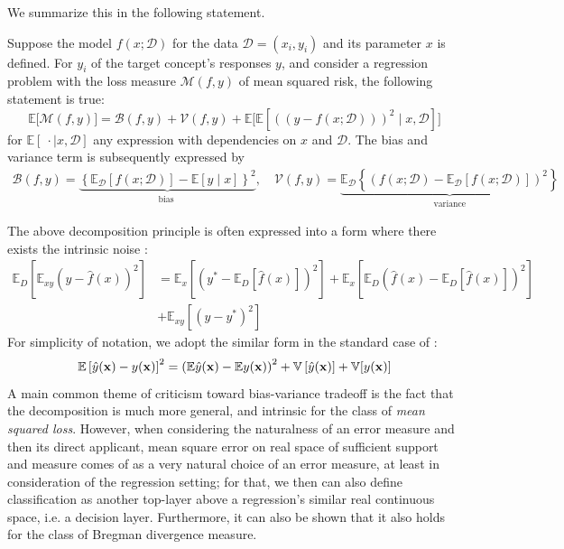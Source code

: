 \documentclass[10pt]{article}
\begin{document}
We summarize this in the following statement. 

\begin{theorem}
    Suppose the model $f(x;\mathcal{D})$ for the data $\mathcal{D}=(x_i, y_i)$ and its parameter $x$ is defined. For $y_{i}$ of the target concept's responses $y$, and consider a regression problem with the loss measure $\mathcal{M}(f,y)$ of mean squared risk, the following statement is true: \begin{equation}
        \mathbb{E}\big[\mathcal{M}(f,y)\big] = \mathcal{B}(f,y) + \mathcal{V}(f,y) + \mathbb{E}\Big[\mathbb{E} \left[((y-f(x;\mathcal{D})))^{2}\mid x, \mathcal{D}\right]\Big]
    \end{equation}
    for $\mathbb{E}[\:\cdot\mid x, \mathcal{D}]$ any expression with dependencies on $x$ and $\mathcal{D}$. The bias and variance term is subsequently expressed by 
    \begin{align}
        \mathcal{B}(f,y) = \underbrace{\left\{ \mathbb{E}_{\mathcal{D}}[f(x;\mathcal{D})] - \mathbb{E}[y\mid x] \right\}^{2}}_{\text{bias }}, \quad \mathcal{V}(f,y) =\underbrace{\mathbb{E}_{\mathcal{D}} \left\{(f(x;\mathcal{D})- \mathbb{E}_{\mathcal{D}}[f(x;\mathcal{D})])^{2}\right\}}_{\text{variance}}
    \end{align}
\end{theorem}

The above decomposition principle is often expressed into a form where there exists the intrinsic noise \cite{brown2024biasvariance}: 
\begin{equation}
    \begin{split}
        \mathbb{E}_D \left[ \mathbb{E}_{xy} \left( y - \hat{f}(x) \right)^2 \right]
        &= 
         \mathbb{E}_x \left[ \left( y^* - \mathbb{E}_D[\hat{f}(x)] \right)^2 \right]
        + \mathbb{E}_x \left[ \mathbb{E}_D \left( \hat{f}(x) - \mathbb{E}_D[\hat{f}(x)] \right)^2 \right] \\
        &+ \mathbb{E}_{xy} \left[ \left( y - y^* \right)^2 \right]
    \end{split}
    \end{equation}
For simplicity of notation, we adopt the similar form in the standard case of \cite{adlam2020understandingdoubledescentrequires}: 
\begin{equation}
    \mathbb{E} \left[{\hat{y}(\mathbf{x})-y(\mathbf{x})}\right]^2 = \left({\mathbb{E}\hat{y}(\mathbf{x}) - \mathbb{E} y(\mathbf{x})}\right)^2 + \mathbb{V}\left[{\hat{y}(\mathbf{x})}\right] + \mathbb{V}[{y(\mathbf{x})}]
\end{equation}
A main common theme of criticism toward bias-variance tradeoff is the fact that the decomposition is much more general, and intrinsic for the class of \textit{mean squared loss}. However, when considering the naturalness of an error measure and then its direct applicant, mean square error on real space of sufficient support and measure comes of as a very natural choice of an error measure, at least in consideration of the regression setting; for that, we then can also define classification as another top-layer above a regression's similar real continuous space, i.e. a decision layer. Furthermore, it can also be shown \cite{brown2024biasvariance,PfauBregmanDivergence} that it also holds for the class of Bregman divergence measure. 
\end{document}

